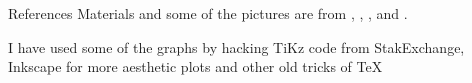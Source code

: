 \documentclass{beamer}
\begin{document}
\begin{frame}{References}
Materials and some of the pictures are from \citep{James2015}, \citep{duda}, \citep{geron2}, and \citep{pestman}.
\printbibliography 	

I have used some of the graphs by hacking TiKz code from StakExchange, Inkscape for more aesthetic plots and other old tricks of \TeX
\end{frame}		
\end{document}

